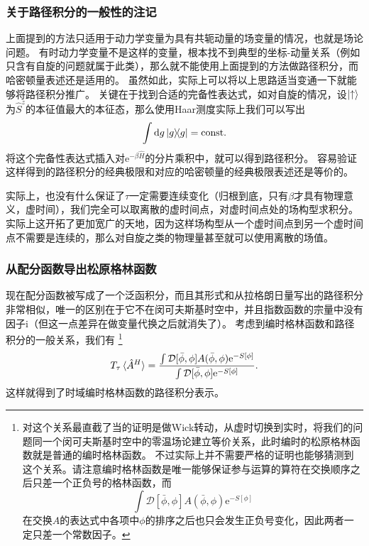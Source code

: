 \documentclass[hyperref, UTF8, a4paper]{ctexart}
\newcommand*{\ii}{\mathrm{i}}
\newcommand*{\ee}{\mathrm{e}}
\newcommand*{\const}{\mathrm{const}}
\newcommand*{\fd}[1]{\mathcal{D}{#1}}
\begin{document}
\subsubsection{关于路径积分的一般性的注记}

上面提到的方法只适用于动力学变量为具有共轭动量的场变量的情况，也就是场论问题。
有时动力学变量不是这样的变量，根本找不到典型的坐标-动量关系（例如只含有自旋的问题就属于此类），那么就不能使用上面提到的方法做路径积分，而哈密顿量表述还是适用的。
虽然如此，实际上可以将以上思路适当变通一下就能够将路径积分推广。
关键在于找到合适的完备性表达式，如对自旋的情况，设$\ket{\uparrow}$为$\hat{S}^z$的本征值最大的本征态，那么使用Haar测度实际上我们可以写出
\[
    \int \dd{g} \dyad{g} = \const.
\]
将这个完备性表达式插入对$\ee^{-\beta \hat{H}}$的分片乘积中，就可以得到路径积分。
容易验证这样得到的路径积分的经典极限和对应的哈密顿量的经典极限表述还是等价的。

实际上，也没有什么保证了$\tau$一定需要连续变化（归根到底，只有$\beta$才具有物理意义，虚时间），我们完全可以取离散的虚时间点，对虚时间点处的场构型求积分。
实际上这开拓了更加宽广的天地，因为这样场构型从一个虚时间点到另一个虚时间点不需要是连续的，那么对自旋之类的物理量甚至就可以使用离散的场值。


\subsubsection{从配分函数导出松原格林函数}

现在配分函数被写成了一个泛函积分，而且其形式和从拉格朗日量写出的路径积分非常相似，唯一的区别在于它不在闵可夫斯基时空中，并且指数函数的宗量中没有因子$\ii$（但这一点差异在做变量代换之后就消失了）。
考虑到编时格林函数和路径积分的一般关系，我们有%
\footnote{对这个关系最直截了当的证明是做Wick转动，从虚时切换到实时，将我们的问题同一个闵可夫斯基时空中的零温场论建立等价关系，此时编时的松原格林函数就是普通的编时格林函数。
不过实际上并不需要严格的证明也能够猜测到这个关系。请注意编时格林函数是唯一能够保证参与运算的算符在交换顺序之后只差一个正负号的格林函数，而
\[
    \int \fd{[\bar{\phi}, \phi]} A(\bar{\phi}, \phi) \ee^{- S[\phi]}
\]
在交换$A$的表达式中各项中$\phi$的排序之后也只会发生正负号变化，因此两者一定只差一个常数因子。
}%
\begin{equation}
    T_\tau \expval*{\hat{A}^H} = \frac{\int \fd{[\bar{\phi}, \phi]} A(\bar{\phi}, \phi) \ee^{- S[\phi]}}{\int \fd{[\bar{\phi}, \phi]} \ee^{- S[\phi]}}.
    \label{eq:imaginary-time-order-path-integral}
\end{equation}
这样就得到了时域编时格林函数的路径积分表示。
\end{document}
